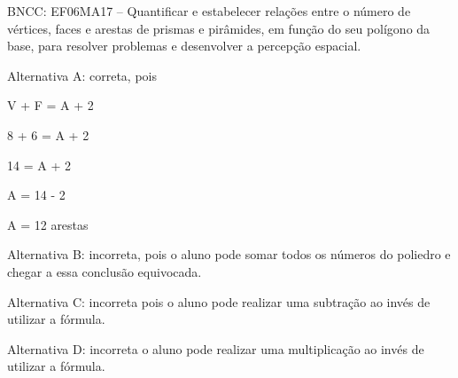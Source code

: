 \begin{enumerate}
BNCC: EF06MA17 -- Quantificar e estabelecer relações entre o número de
vértices, faces e arestas de prismas e pirâmides, em função do seu
polígono da base, para resolver problemas e desenvolver a percepção
espacial.

Alternativa A: correta, pois

V + F = A + 2

8 + 6 = A + 2

14 = A + 2

A = 14 - 2

A = 12 arestas

Alternativa B: incorreta, pois o aluno pode somar todos os números do
poliedro e chegar a essa conclusão equivocada.

Alternativa C: incorreta pois o aluno pode realizar uma subtração ao
invés de utilizar a fórmula.

Alternativa D: incorreta o aluno pode realizar uma multiplicação ao
invés de utilizar a fórmula.

	\end{enumerate}


